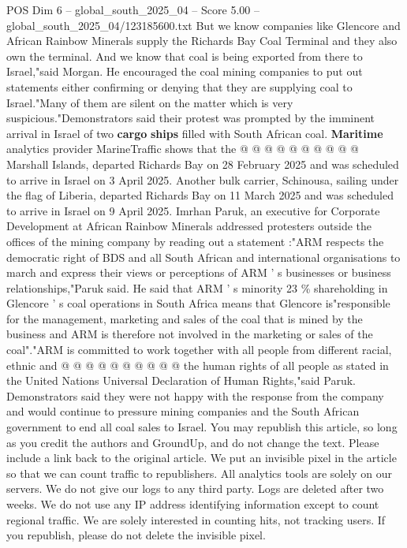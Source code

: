 \begin{textsample}{POS Dim 6 – global\_south\_2025\_04 – Score 5.00 – global\_south\_2025\_04/123185600.txt}
But we know companies like Glencore and African Rainbow Minerals supply the Richards Bay Coal Terminal and they also own the terminal.
And we know that coal is being exported from there to Israel,"said Morgan.
He encouraged the coal mining companies to put out statements either confirming or denying that they are supplying coal to Israel."Many of them are silent on the matter which is very suspicious."Demonstrators said their protest was prompted by the imminent arrival in Israel of two \textbf{cargo} \textbf{ships} filled with South African coal. \textbf{Maritime} analytics provider MarineTraffic shows that the @ @ @ @ @ @ @ @ @ @ Marshall Islands, departed Richards Bay on 28 February 2025 and was scheduled to arrive in Israel on 3 April 2025.
Another bulk carrier, Schinousa, sailing under the flag of Liberia, departed Richards Bay on 11 March 2025 and was scheduled to arrive in Israel on 9 April 2025.
Imrhan Paruk, an executive for Corporate Development at African Rainbow Minerals addressed protesters outside the offices of the mining company by reading out a statement :"ARM respects the democratic right of BDS and all South African and international organisations to march and express their views or perceptions of ARM ' s businesses or business relationships,"Paruk said.
He said that ARM ' s minority 23 \% shareholding in Glencore ' s coal operations in South Africa means that Glencore is"responsible for the management, marketing and sales of the coal that is mined by the business and ARM is therefore not involved in the marketing or sales of the coal"."ARM is committed to work together with all people from different racial, ethnic and @ @ @ @ @ @ @ @ @ @ the human rights of all people as stated in the United Nations Universal Declaration of Human Rights,"said Paruk.
Demonstrators said they were not happy with the response from the company and would continue to pressure mining companies and the South African government to end all coal sales to Israel.
You may republish this article, so long as you credit the authors and GroundUp, and do not change the text.
Please include a link back to the original article.
We put an invisible pixel in the article so that we can count traffic to republishers.
All analytics tools are solely on our servers.
We do not give our logs to any third party.
Logs are deleted after two weeks.
We do not use any IP address identifying information except to count regional traffic.
We are solely interested in counting hits, not tracking users.
If you republish, please do not delete the invisible pixel.

\end{textsample}
